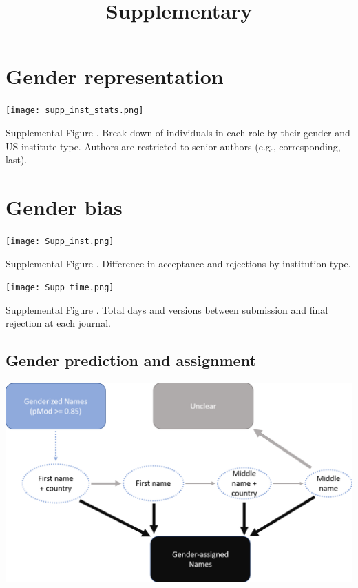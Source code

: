 \documentclass[11pt,]{article}
\title{Supplementary}
\author{}
\date{}
\begin{document}
\maketitle

\section{Gender representation}\label{gender-representation}

\texttt{[image: supp\_inst\_stats.png]}

Supplemental Figure . Break down of individuals in each role by their
gender and US institute type. Authors are restricted to senior authors
(e.g., corresponding, last).

\newpage

\section{Gender bias}\label{gender-bias}

\texttt{[image: Supp\_inst.png]}

Supplemental Figure . Difference in acceptance and rejections by
institution type.

\newpage

\texttt{[image: Supp\_time.png]}

Supplemental Figure . Total days and versions between submission and
final rejection at each journal.

\newpage

\subsection{Gender prediction and
assignment}\label{gender-prediction-and-assignment}

\includegraphics{genderize_method.png}
\end{document}
